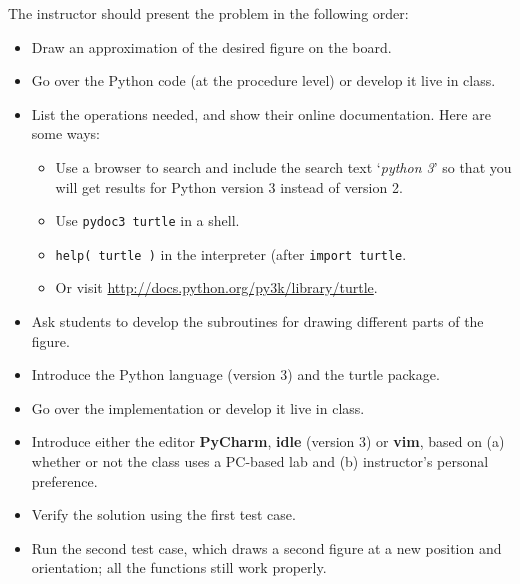 \documentclass[pdftex,12pt]{artikel3}
\begin{document}
The instructor should present the problem in the following order:
\begin{itemize}
\item
  Draw an approximation of the desired figure on the board.
\item
  Go over the Python code (at the procedure level) or develop it live in class.
\item
  List the operations needed, and 
  show their online documentation. Here are some ways:
    \begin{itemize}
    \item
    Use a browser to search and include the search text `\emph{python 3}'
    so that you will get results for Python version 3 instead of version 2.
    \item
    Use {\tt pydoc3 turtle} in a shell.
    \item
    {\tt help( turtle )} in the interpreter (after {\tt import turtle}.
    \item
    Or visit \url{http://docs.python.org/py3k/library/turtle}.
    \end{itemize}
\item
  Ask students to develop the subroutines 
  for drawing different parts of the figure.
\item
  Introduce the Python language (version 3) and the turtle package.
\item
  Go over the implementation or develop it live in class.
\item
  Introduce either the editor \textbf{PyCharm}, \textbf{idle} (version 3)
  or \textbf{vim}, based on (a) whether or not the class uses a PC-based lab
  and (b) instructor's personal preference.
\item
  Verify the solution using the first test case.
\item
  Run the second test case, which draws a second figure 
  at a new position and orientation; all the functions still work properly.
\end{itemize}
\end{document}
